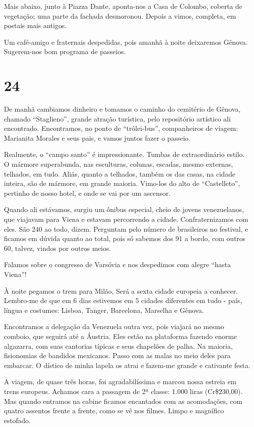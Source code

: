 Mais abaixo, junto à Piazza Dante, aponta-nos a Casa de Colombo, coberta de vegetação; uma parte da fachada desmoronou. Depois a vimos, completa, em postais mais antigos.

Um café-amigo e fraternais despedidas, pois amanhã à noite deixaremos Gênova. Sugerem-nos bom programa de passeios.

\section*{24 \adfflatleafright {}}
De manhã cambiamos dinheiro e tomamos o caminho do cemitério de Gênova, chamado “Staglieno”, grande atração turística, pelo repositório artístico ali encontrado. Encontramos, no ponto de “trôlei-bus”, companheiros de viagem: Marianita Morales e seus pais, e vamos juntos fazer o passeio.

Realmente, o “campo santo” é impressionante. Tumbas de extraordinário estilo. O mármore superabunda, nas esculturas, colunas, escadas, mesmo externas, telhados, em tudo. Aliás, quanto a telhados, também os das casas, na cidade inteira, são de mármore, em grande maioria. Vimo-los do alto de “Castelleto”, pertinho de nosso hotel, e onde se vai por um ascensor.

Quando ali estávamos, surgiu um ônibus especial, cheio de jovens venezuelanos, que viajavam para Viena e estavam percorrendo a cidade. Confraternizamos com eles. São 240 ao todo, dizem. Perguntam pelo número de brasileiros no festival, e ficamos em dúvida quanto ao total, pois só sabemos dos 91 a bordo, com outros 60, talvez, vindos por outros meios.

Falamos sobre o congresso de Varsóvia e nos despedimos com alegre “hasta Viena”!

À noite pegamos o trem para Milão, Será a sexta cidade europeia a conhecer. Lembro-me de que em 6 dias estivemos em 5 cidades diferentes em tudo - país, língua e costumes: Lisboa, Tanger, Barcelona, Marselha e Gênova.

Encontramos a delegação da Venezuela outra vez, pois viajará no mesmo comboio, que seguirá até a Áustria. Eles estão na plataforma fazendo enorme algazarra, com suas cantorias típicas e seus chapelões de palha. Na maioria, fisionomias de bandidos mexicanos. Passo com as malas no meio deles para embarcar. O dístico de minha lapela os atrai e fazem-me grande e cativante festa.

A viagem, de quase três horas, foi agradabilíssima e marcou nossa estreia em trens europeus. Achamos cara a passagem de 2ª classe: 1.000 liras (Cr\$230,00). Mas quando entramos na cabine ficamos encantados com as acomodações, com quatro assentos frente a frente, como se vê nos filmes. Limpo e magnífico estofado.

